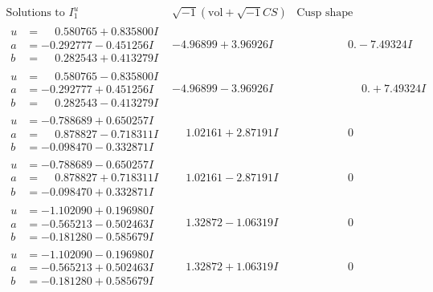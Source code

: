 \documentclass[1p]{elsarticle_modified}
\theoremstyle{definition}
\newcommand{\I}{\sqrt{-1}}
\begin{document}
$$\begin{array}{c|c|c}  
\text{Solutions to }I^u_{1}& \I (\text{vol} + \sqrt{-1}CS) & \text{Cusp shape}\\
 \hline 
\begin{aligned}
u &= \phantom{-}0.580765 + 0.835800 I \\
a &= -0.292777 - 0.451256 I \\
b &= \phantom{-}0.282543 + 0.413279 I\end{aligned}
 & -4.96899 + 3.96926 I & \phantom{-0.000000 } 0. - 7.49324 I \\ \hline\begin{aligned}
u &= \phantom{-}0.580765 - 0.835800 I \\
a &= -0.292777 + 0.451256 I \\
b &= \phantom{-}0.282543 - 0.413279 I\end{aligned}
 & -4.96899 - 3.96926 I & \phantom{-0.000000 -}0. + 7.49324 I \\ \hline\begin{aligned}
u &= -0.788689 + 0.650257 I \\
a &= \phantom{-}0.878827 - 0.718311 I \\
b &= -0.098470 - 0.332871 I\end{aligned}
 & \phantom{-}1.02161 + 2.87191 I & \phantom{-0.000000 } 0 \\ \hline\begin{aligned}
u &= -0.788689 - 0.650257 I \\
a &= \phantom{-}0.878827 + 0.718311 I \\
b &= -0.098470 + 0.332871 I\end{aligned}
 & \phantom{-}1.02161 - 2.87191 I & \phantom{-0.000000 } 0 \\ \hline\begin{aligned}
u &= -1.102090 + 0.196980 I \\
a &= -0.565213 - 0.502463 I \\
b &= -0.181280 - 0.585679 I\end{aligned}
 & \phantom{-}1.32872 - 1.06319 I & \phantom{-0.000000 } 0 \\ \hline\begin{aligned}
u &= -1.102090 - 0.196980 I \\
a &= -0.565213 + 0.502463 I \\
b &= -0.181280 + 0.585679 I\end{aligned}
 & \phantom{-}1.32872 + 1.06319 I & \phantom{-0.000000 } 0 \\ \hline\begin{aligned}

\end{aligned}
\end{array}$$
\end{document}
